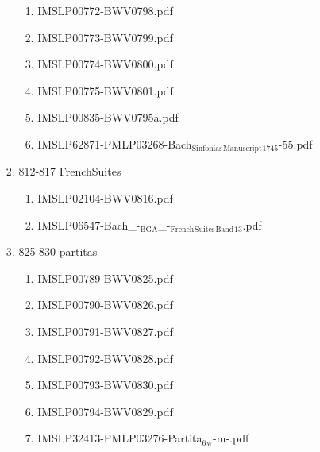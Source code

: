 \documentclass[11pt]{article}
\begin{document}
\begin{enumerate}
\begin{enumerate}
\begin{enumerate}
\begin{enumerate}
\item IMSLP00772-BWV0798.pdf
\label{sec-1-1-1-1-44-6-4-2-2-12}

\item IMSLP00773-BWV0799.pdf
\label{sec-1-1-1-1-44-6-4-2-2-13}

\item IMSLP00774-BWV0800.pdf
\label{sec-1-1-1-1-44-6-4-2-2-14}

\item IMSLP00775-BWV0801.pdf
\label{sec-1-1-1-1-44-6-4-2-2-15}

\item IMSLP00835-BWV0795a.pdf
\label{sec-1-1-1-1-44-6-4-2-2-16}

\item IMSLP62871-PMLP03268-Bach$_{\text{Sinfonias}}$$_{\text{Manuscript}}$$_{\text{1745}}$-55.pdf
\label{sec-1-1-1-1-44-6-4-2-2-17}
\end{enumerate}

\item 812-817 FrenchSuites
\label{sec-1-1-1-1-44-6-4-2-3}
\begin{enumerate}
\item IMSLP02104-BWV0816.pdf
\label{sec-1-1-1-1-44-6-4-2-3-1}

\item IMSLP06547-Bach\_-$_{\text{BGA}}$\_-$_{\text{French}}$$_{\text{Suites}}$$_{\text{Band}}$$_{\text{13}}$.pdf
\label{sec-1-1-1-1-44-6-4-2-3-2}
\end{enumerate}

\item 825-830 partitas
\label{sec-1-1-1-1-44-6-4-2-4}
\begin{enumerate}
\item IMSLP00789-BWV0825.pdf
\label{sec-1-1-1-1-44-6-4-2-4-1}

\item IMSLP00790-BWV0826.pdf
\label{sec-1-1-1-1-44-6-4-2-4-2}

\item IMSLP00791-BWV0827.pdf
\label{sec-1-1-1-1-44-6-4-2-4-3}

\item IMSLP00792-BWV0828.pdf
\label{sec-1-1-1-1-44-6-4-2-4-4}

\item IMSLP00793-BWV0830.pdf
\label{sec-1-1-1-1-44-6-4-2-4-5}

\item IMSLP00794-BWV0829.pdf
\label{sec-1-1-1-1-44-6-4-2-4-6}

\item IMSLP32413-PMLP03276-Partita$_{\text{6}}$$_{\text{w}}$-m-.pdf
\label{sec-1-1-1-1-44-6-4-2-4-7}


\end{enumerate}
\end{enumerate}
\end{enumerate}
\end{enumerate}
\end{document}
